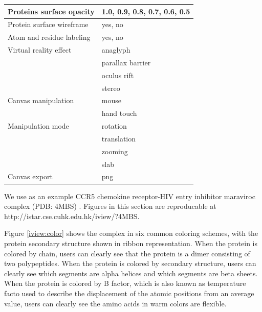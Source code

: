 \begin{table}
\begin{tabular}{ll}
\hline
 Proteins surface opacity & 1.0, 0.9, 0.8, 0.7, 0.6, 0.5\\
\hline
Protein surface wireframe & yes, no\\
\hline
Atom and residue labeling & yes, no\\
\hline
   Virtual reality effect & anaglyph\\
                          & parallax barrier\\
                          & oculus rift\\
                          & stereo\\
\hline
      Canvas manipulation & mouse\\
                          & hand touch\\
\hline
        Manipulation mode & rotation\\
                          & translation\\
                          & zooming\\
                          & slab\\
\hline
            Canvas export & png\\
\hline
\end{tabular}
\end{table}

We use as an example CCR5 chemokine receptor-HIV entry inhibitor maraviroc complex (PDB: 4MBS) \citep{1348}. Figures in this section are reproducable at http://istar.cse.cuhk.edu.hk/iview/?4MBS.

Figure \ref{iview:color} shows the complex in six common coloring schemes, with the protein secondary structure shown in ribbon representation. When the protein is colored by chain, users can clearly see that the protein is a dimer consisting of two polypeptides. When the protein is colored by secondary structure, users can clearly see which segments are alpha helices and which segments are beta sheets. When the protein is colored by B factor, which is also known as temperature facto used to describe the displacement of the atomic positions from an average value, users can clearly see the amino acids in warm colors are flexible.

